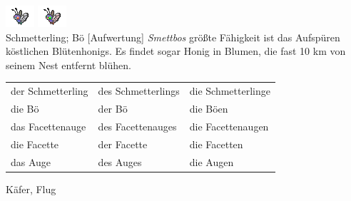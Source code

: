 \documentclass[a7paper,10pt,%
,toc
,print
]{kartei}
\begin{document}
\begin{karte}[Facettenauge]{
\includegraphics{../regular/butterfree}
\includegraphics{../shiny/butterfree} \\
Schmetterling; Bö
}[Aufwertung]
\emph{Smettbos} größte Fähigkeit ist das Aufspüren köstlichen Blüten\-honigs. Es 
findet sogar Honig in Blumen, die fast 10 km von seinem Nest entfernt blühen.

\vspace{5pt}
\begin{tabular}{lll}
der Schmetterling	&	des Schmetterlings	&	die Schmetterlinge \\
die Bö	&	der Bö	&	die Böen \\
das Facettenauge	&	des Facettenauges	&	die Facettenaugen\\
die Facette	&	der Facette	&	die Facetten \\
das Auge	&	des Auges	&	die Augen \\
\end{tabular}
\vspace{5pt}

Käfer, Flug
\end{karte}




\end{document}
